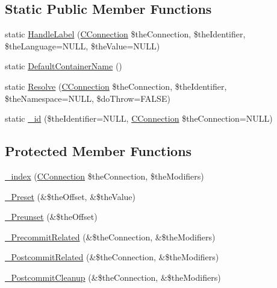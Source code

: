 \subsection*{Static Public Member Functions}
\begin{DoxyCompactItemize}
\item 
static \hyperlink{class_c_ontology_term_ab4c98ee0a638974d6c422fcb9df31471}{Handle\-Label} (\hyperlink{class_c_connection}{C\-Connection} \$the\-Connection, \$the\-Identifier, \$the\-Language=N\-U\-L\-L, \$the\-Value=N\-U\-L\-L)
\item 
static \hyperlink{class_c_ontology_term_a41ecd119648036a63b083f1dad064554}{Default\-Container\-Name} ()
\item 
static \hyperlink{class_c_ontology_term_aaea30804fc8ceae42f91401f69ad6b88}{Resolve} (\hyperlink{class_c_connection}{C\-Connection} \$the\-Connection, \$the\-Identifier, \$the\-Namespace=N\-U\-L\-L, \$do\-Throw=F\-A\-L\-S\-E)
\item 
static \hyperlink{class_c_ontology_term_a34f4c98f9a5b40ed2294bf4c8f6e7d0c}{\-\_\-id} (\$the\-Identifier=N\-U\-L\-L, \hyperlink{class_c_connection}{C\-Connection} \$the\-Connection=N\-U\-L\-L)
\end{DoxyCompactItemize}
\subsection*{Protected Member Functions}
\begin{DoxyCompactItemize}
\item 
\hyperlink{class_c_ontology_term_a58ac83da7057515fec5df925d0d1c5eb}{\-\_\-index} (\hyperlink{class_c_connection}{C\-Connection} \$the\-Connection, \$the\-Modifiers)
\item 
\hyperlink{class_c_ontology_term_adce9339df9c3100d72743b4002f3a547}{\-\_\-\-Preset} (\&\$the\-Offset, \&\$the\-Value)
\item 
\hyperlink{class_c_ontology_term_af1217a9514c3a9a2976729863636ff92}{\-\_\-\-Preunset} (\&\$the\-Offset)
\item 
\hyperlink{class_c_ontology_term_a2e76b241a1855f7c50d070831f3c742e}{\-\_\-\-Precommit\-Related} (\&\$the\-Connection, \&\$the\-Modifiers)
\item 
\hyperlink{class_c_ontology_term_af14ed2c9929119cf4d4de6eda5026248}{\-\_\-\-Postcommit\-Related} (\&\$the\-Connection, \&\$the\-Modifiers)
\item 
\hyperlink{class_c_ontology_term_ae5a6a16b10c3b6f5cbc8e4a515adea96}{\-\_\-\-Postcommit\-Cleanup} (\&\$the\-Connection, \&\$the\-Modifiers)
\end{DoxyCompactItemize}
